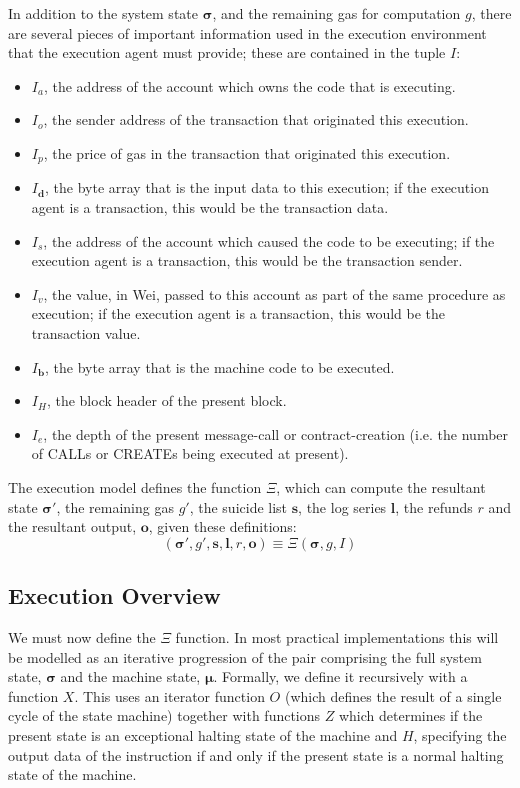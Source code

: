 \documentclass[9pt,oneside]{amsart}
\begin{document}
\begin{multicols}{2}
In addition to the system state $\boldsymbol{\sigma}$, and the remaining gas for computation $g$, there are several pieces of important information used in the execution environment that the execution agent must provide; these are contained in the tuple $I$:

\begin{itemize}
\item $I_a$, the address of the account which owns the code that is executing.
\item $I_o$, the sender address of the transaction that originated this execution.
\item $I_p$, the price of gas in the transaction that originated this execution.
\item $I_\mathbf{d}$, the byte array that is the input data to this execution; if the execution agent is a transaction, this would be the transaction data.
\item $I_s$, the address of the account which caused the code to be executing; if the execution agent is a transaction, this would be the transaction sender.
\item $I_v$, the value, in Wei, passed to this account as part of the same procedure as execution; if the execution agent is a transaction, this would be the transaction value.
\item $I_\mathbf{b}$, the byte array that is the machine code to be executed.
\item $I_H$, the block header of the present block.
\item $I_e$, the depth of the present message-call or contract-creation (i.e. the number of {\small CALL}s or {\small CREATE}s being executed at present).
\end{itemize}

The execution model defines the function $\Xi$, which can compute the resultant state $\boldsymbol{\sigma}'$, the remaining gas $g'$, the suicide list $\mathbf{s}$, the log series $\mathbf{l}$, the refunds $r$ and the resultant output, $\mathbf{o}$, given these definitions:
\begin{equation}
(\boldsymbol{\sigma}', g', \mathbf{s}, \mathbf{l}, r, \mathbf{o}) \equiv \Xi(\boldsymbol{\sigma}, g, I)
\end{equation}

\subsection{Execution Overview}

We must now define the $\Xi$ function. In most practical implementations this will be modelled as an iterative progression of the pair comprising the full system state, $\boldsymbol{\sigma}$ and the machine state, $\boldsymbol{\mu}$. Formally, we define it recursively with a function $X$. This uses an iterator function $O$ (which defines the result of a single cycle of the state machine) together with functions $Z$ which determines if the present state is an exceptional halting state of the machine and $H$, specifying the output data of the instruction if and only if the present state is a normal halting state of the machine.


\end{multicols}
\end{document}
